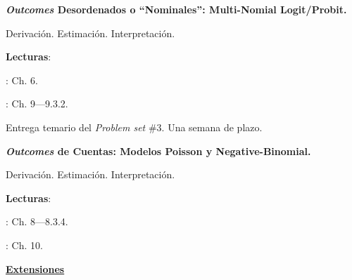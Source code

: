 \documentclass[letterpaper]{article}
\renewenvironment{itemize}{
  \begin{list}{}{
    \setlength{\leftmargin}{1.5em}
  }
}{
  \end{list}
}
\begin{document}
\begin{enumerate}[label=\roman*.]
       \begin{itemize} 
        \item[16.] {\bf \emph{Outcomes} Desordenados o ``Nominales'': Multi-Nomial Logit/Probit.}
        \begin{itemize} 
          \item[$\circ$] Derivaci\'on. Estimaci\'on. Interpretaci\'on.
          \item[$\circ$] {\bf Lecturas}: 
            \begin{itemize} 
              \item[$\diamond$] \textcite{Long2001}: Ch. 6.
              \item[$\diamond$] \textcite{Ward2018}: Ch. 9---9.3.2.
            \end{itemize}
        \end{itemize}
      \end{itemize}



\item[{\color{red}\Pointinghand}] Entrega temario del \emph{Problem set} \#3. Una semana de plazo.



       \begin{itemize} 
        \item[17.] {\bf \emph{Outcomes} de Cuentas: Modelos Poisson y Negative-Binomial.}
        \begin{itemize} 
          \item[$\circ$] Derivaci\'on. Estimaci\'on. Interpretaci\'on.
          \item[$\circ$] {\bf Lecturas}: 
            \begin{itemize} 
              \item[$\diamond$] \textcite{Long2001}: Ch. 8---8.3.4.
              \item[$\diamond$] \textcite{Ward2018}: Ch. 10.
            \end{itemize}
        \end{itemize}
      \end{itemize}



\item {\bf {\color{ForestGreen}\underline{Extensiones}}}


\end{enumerate}
\end{document}
